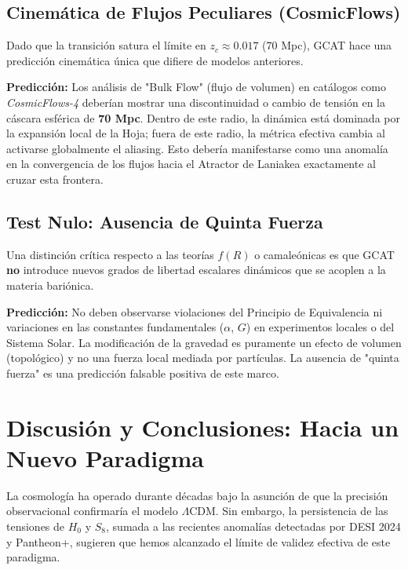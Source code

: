 \documentclass[12pt, a4paper]{article}
\theoremstyle{plain}
\theoremstyle{definition}
\begin{document}
\subsection{Cinemática de Flujos Peculiares (CosmicFlows)}

Dado que la transición satura el límite en $z_c \approx 0.017$ (70 Mpc), GCAT hace una predicción cinemática única que difiere de modelos anteriores.

\textbf{Predicción:} Los análisis de "Bulk Flow" (flujo de volumen) en catálogos como \textit{Cosmic\-Flows-4} deberían mostrar una discontinuidad o cambio de tensión en la cáscara esférica de \textbf{70 Mpc}. Dentro de este radio, la dinámica está dominada por la expansión local de la Hoja; fuera de este radio, la métrica efectiva cambia al activarse globalmente el aliasing. Esto debería manifestarse como una anomalía en la convergencia de los flujos hacia el Atractor de Laniakea exactamente al cruzar esta frontera.

\subsection{Test Nulo: Ausencia de Quinta Fuerza}

Una distinción crítica respecto a las teorías $f(R)$ o camaleónicas es que GCAT \textbf{no} introduce nuevos grados de libertad escalares dinámicos que se acoplen a la materia bariónica.

\textbf{Predicción:} No deben observarse violaciones del Principio de Equivalencia ni variaciones en las constantes fundamentales ($\alpha$, $G$) en experimentos locales o del Sistema Solar. La modificación de la gravedad es puramente un efecto de volumen (topológico) y no una fuerza local mediada por partículas. La ausencia de "quinta fuerza" es una predicción falsable positiva de este marco.

\section{Discusión y Conclusiones: Hacia un Nuevo Paradigma}
\label{sec:conclusiones}

La cosmología ha operado durante décadas bajo la asunción de que la precisión observacional confirmaría el modelo $\Lambda$CDM. Sin embargo, la persistencia de las tensiones de $H_0$ y $S_8$, sumada a las recientes anomalías detectadas por DESI 2024 y Pantheon+, sugieren que hemos alcanzado el límite de validez efectiva de este paradigma.
\end{document}
